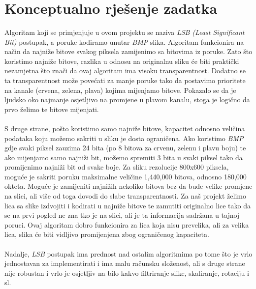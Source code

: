 \documentclass[times, utf8, seminar, numeric]{fer}
\begin{document}
\section{Konceptualno rješenje zadatka}
\paragraph{}
Algoritam koji se primjenjuje u ovom projektu se naziva \textit{LSB (Least Significant Bit)} postupak, a poruke kodiramo unutar \textit{BMP} slika. Algoritam funkcionira na način da najniže bitove svakog piksela zamijenimo sa bitovima iz poruke. Zato što koristimo najniže bitove, razlika u odnosu na originalnu sliku će biti praktički nezamjetna što znači da ovaj algoritam ima visoku transparentnost. Dodatno se ta transparentnost može povećati za manje poruke tako da postavimo prioritete na kanale (crvena, zelena, plava) kojima mijenjamo bitove. Pokazalo se da je ljudsko oko najmanje osjetljivo na promjene u plavom kanalu, stoga je logično da prvo želimo te bitove mijenjati.
\paragraph{}
S druge strane, pošto koristimo samo najniže bitove, kapacitet odnosno veličina podataka koju možemo sakriti u sliku je dosta ograničena. Ako koristimo \textit{BMP} gdje svaki piksel zauzima 24 bita (po 8 bitova za crvenu, zelenu i plavu boju) te ako  mijenjamo samo najniži bit, možemo spremiti 3 bita u svaki piksel tako da promijenimo najniži bit od svake  boje. Za sliku rezolucije 800x600 piksela, moguće je sakriti poruku maksimalne veličine 1,440,000 bitova, odnosno 180,000 okteta. Moguće je zamijeniti najnižih nekoliko bitova bez da bude velike promjene na slici, ali više od toga dovodi do slabe transparentnosti. Za naš projekt želimo lica sa slike izdvojiti i kodirati u najniže bitove te zamutiti originalno lice tako da se na prvi pogled ne zna tko je na slici, ali je ta informacija sadržana u tajnoj poruci. Ovaj algoritam dobro funkcionira za lica koja nisu prevelika, ali za velika lica, slika će biti vidljivo promijenjena zbog ograničenog kapaciteta.
\paragraph{}
Nadalje, \textit{LSB} postupak ima prednost nad ostalim algoritmima po tome što je vrlo jednostavan za implementirati i ima malu računsku složenost, ali s druge strane nije robustan i vrlo je osjetljiv na bilo kakvo filtriranje slike, skaliranje, rotaciju i sl. 
\end{document}
